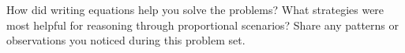 \documentclass[10pt]{article}
\begin{document}
\vspace{1em}
\begin{tcolorbox}[colframe=black!60, colback=white, 
coltitle=black, colbacktitle=black!15, fonttitle=\bfseries\Large, 
title=Reflection, halign title=center, left=10pt, right=10pt, top=10pt, bottom=100pt]
How did writing equations help you solve the problems? What strategies were most helpful for reasoning through proportional scenarios? Share any patterns or observations you noticed during this problem set.
\end{tcolorbox}
\end{document}
